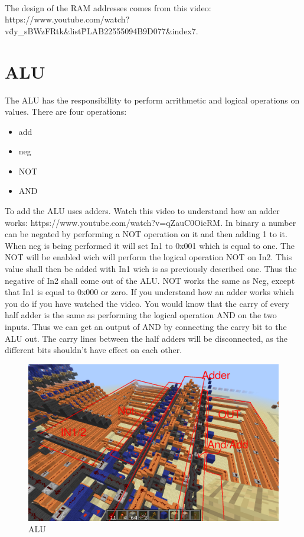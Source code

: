 \documentclass{article}
\newcommand{\adder}{https://www.youtube.com/watch?v=qZauC0OicRM}
\newcommand{\BennysRAM}{https://www.youtube.com/watch?v\=dy\_sBWzFRtk\&list\=PLAB22555094B9D077\&index\=7}
\begin{document}
~\\
The design of the RAM addresses comes from this video: \BennysRAM.
\section{ALU}
The ALU has the responsibillity to perform arrithmetic and logical operations on values.
There are four operations:
\begin{itemize}
	\item{add}
	\item{neg}
	\item{NOT}
	\item{AND}
\end{itemize}
To add the ALU uses adders. Watch this video to understand how an adder works: \adder. In binary a number can be negated by performing a NOT operation on it and then adding 1 to it. When neg is being performed it will set In1 to 0x001 which is equal to one. The NOT will be enabled wich will perform the logical operation NOT on In2. This value shall then be added with In1 wich is as previously described one. Thus the negative of In2 shall come out of the ALU. NOT works the same as Neg, except that In1 is equal to 0x000 or zero. If you understand how an adder works which you do if you have watched the video. You would know that the carry of every half adder is the same as performing the logical operation AND on the two inputs. Thus we can get an output of AND by connecting the carry bit to the ALU out. The carry lines between the half adders will be disconnected, as the different bits shouldn't have effect on each other.
\begin{figure}[h]
	\includegraphics[width=\textwidth]{ALU3.png}	
	\caption{ALU}
\end{figure}
\end{document}
